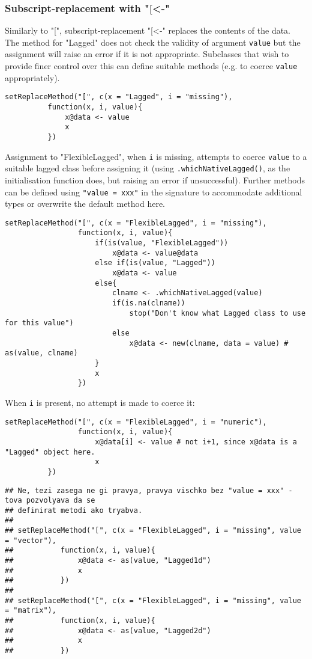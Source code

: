\documentclass[11pt,a4paper]{article}
\begin{document}
\subsubsection{Subscript-replacement with "[<-"}
\label{sec:org06e120a}

Similarly to "[", subscript-replacement "[<-" replaces the contents of the data.  The method
for "Lagged" does not check the validity of argument \texttt{value} but the assignment will
raise an error if it is not appropriate. Subclasses that wish to provide finer control over
this can define suitable methods (e.g. to coerce \texttt{value} appropriately).
\begin{verbatim}
setReplaceMethod("[", c(x = "Lagged", i = "missing"),
          function(x, i, value){
              x@data <- value
              x
          })
\end{verbatim}

Assignment to "FlexibleLagged", when \texttt{i} is missing, attempts to coerce \texttt{value} to a suitable
lagged class before assigning it (using \texttt{.whichNativeLagged()}, as the initialisation
function does, but raising an error if unsuccessful). Further methods can be defined using
\texttt{"value = xxx"} in the signature to accommodate additional types or overwrite the default
method here.
\begin{verbatim}
setReplaceMethod("[", c(x = "FlexibleLagged", i = "missing"),
                 function(x, i, value){
                     if(is(value, "FlexibleLagged"))
                         x@data <- value@data
                     else if(is(value, "Lagged"))
                         x@data <- value
                     else{
                         clname <- .whichNativeLagged(value)
                         if(is.na(clname))
                             stop("Don't know what Lagged class to use for this value")
                         else
                             x@data <- new(clname, data = value) # as(value, clname)
                     }
                     x
                 })
\end{verbatim}
When \texttt{i} is present, no attempt is made to coerce it:
\begin{verbatim}
setReplaceMethod("[", c(x = "FlexibleLagged", i = "numeric"),
                 function(x, i, value){
                     x@data[i] <- value # not i+1, since x@data is a "Lagged" object here.
                     x
          })
\end{verbatim}

\begin{verbatim}
## Ne, tezi zasega ne gi pravya, pravya vischko bez "value = xxx" - tova pozvolyava da se
## definirat metodi ako tryabva.
##
## setReplaceMethod("[", c(x = "FlexibleLagged", i = "missing", value = "vector"),
##           function(x, i, value){
##               x@data <- as(value, "Lagged1d")
##               x
##           })
##
## setReplaceMethod("[", c(x = "FlexibleLagged", i = "missing", value = "matrix"),
##           function(x, i, value){
##               x@data <- as(value, "Lagged2d")
##               x
##           })
\end{verbatim}
\end{document}
